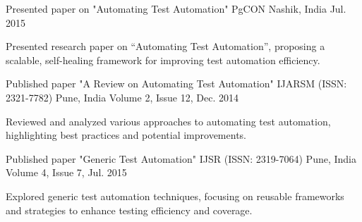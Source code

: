 

\begin{cventries}

  \cventry
    {Presented paper on "Automating Test Automation"} %
    {PgCON} %
    {Nashik, India} %
    {Jul. 2015} %
    {
      \begin{cvitems} %
        \item {Presented research paper on “Automating Test Automation”, proposing a scalable, self-healing framework for improving test automation efficiency.}
      \end{cvitems}
    }

  \cventry
    {Published paper "A Review on Automating Test Automation"} %
    {IJARSM (ISSN: 2321-7782)} %
    {Pune, India} %
    {Volume 2, Issue 12, Dec. 2014} %
    {
      \begin{cvitems} %
        \item {Reviewed and analyzed various approaches to automating test automation, highlighting best practices and potential improvements.}
      \end{cvitems}
    }

  \cventry
    {Published paper "Generic Test Automation"} %
    {IJSR (ISSN: 2319-7064)} %
    {Pune, India} %
    {Volume 4, Issue 7, Jul. 2015} %
    {
      \begin{cvitems} %
        \item {Explored generic test automation techniques, focusing on reusable frameworks and strategies to enhance testing efficiency and coverage.}
      \end{cvitems}
    }

\end{cventries}
